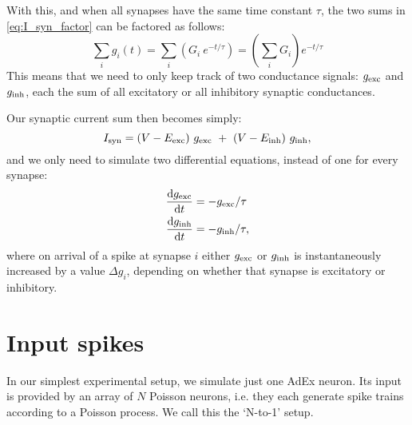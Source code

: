 With this, and when all synapses have the same time constant $\tau$, the two sums in \cref{eq:I_syn_factor} can be factored as follows:\footnotemark
{}
\begin{equation}
    \sum_i g_i(t) = \sum_i \left( G_i\ e^{-t/\tau} \right)
                            = \left( \sum_i G_i  \right) e^{-t/\tau}
\end{equation}
This means that we need to only keep track of two conductance signals: $g_{\text{exc}}$ and $g_{\text{inh}}$, each the sum of all excitatory or all inhibitory synaptic conductances.


Our synaptic current sum then becomes simply:
\begin{equation}
    I_{\text{syn}} = (V - E_{\text{exc}})\ g_{\text{exc}} \  + \  (V - E_{\text{inh}})\ g_{\text{inh}},
\end{equation}
and we only need to simulate two differential equations, instead of one for every synapse:
\begin{align*}
    \frac{\mathrm{d}g_{\text{exc}}}{\mathrm{d}t} &= -g_{\text{exc}} / \tau \\
    \frac{\mathrm{d}g_{\text{inh}}}{\mathrm{d}t} &= -g_{\text{inh}} / \tau,
\end{align*}
where on arrival of a spike at synapse $i$ either $g_{\text{exc}}$ or $g_{\text{inh}}$ is instantaneously increased by a value $Δg_i$, depending on whether that synapse is excitatory or inhibitory.


\section{Input spikes}

In our simplest experimental setup, we simulate just one AdEx neuron.
Its input is provided by an array of $N$ Poisson neurons, i.e. they each generate spike trains according to a Poisson process. We call this the `N-to-1' setup.

